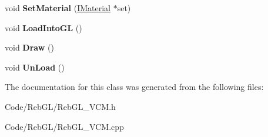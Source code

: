 \begin{DoxyCompactItemize}
\item 
void {\bfseries Set\+Material} (\hyperlink{class_i_material}{I\+Material} $\ast$set)\hypertarget{class_reb_g_l_vertex_buffer_a9a7fff4adcbda95a40b1958b4cbdb4e7}{}\label{class_reb_g_l_vertex_buffer_a9a7fff4adcbda95a40b1958b4cbdb4e7}

\item 
void {\bfseries Load\+Into\+GL} ()\hypertarget{class_reb_g_l_vertex_buffer_a8c25bba7640f896906bfd35110dee474}{}\label{class_reb_g_l_vertex_buffer_a8c25bba7640f896906bfd35110dee474}

\item 
void {\bfseries Draw} ()\hypertarget{class_reb_g_l_vertex_buffer_a57cceb719b252fa17a48b254e9041cd2}{}\label{class_reb_g_l_vertex_buffer_a57cceb719b252fa17a48b254e9041cd2}

\item 
void {\bfseries Un\+Load} ()\hypertarget{class_reb_g_l_vertex_buffer_a1b10ffebb95d27fb0b1d5cbbc5239f7a}{}\label{class_reb_g_l_vertex_buffer_a1b10ffebb95d27fb0b1d5cbbc5239f7a}

\end{DoxyCompactItemize}


The documentation for this class was generated from the following files\+:\begin{DoxyCompactItemize}
\item 
Code/\+Reb\+G\+L/Reb\+G\+L\+\_\+\+V\+C\+M.\+h\item 
Code/\+Reb\+G\+L/Reb\+G\+L\+\_\+\+V\+C\+M.\+cpp\end{DoxyCompactItemize}
